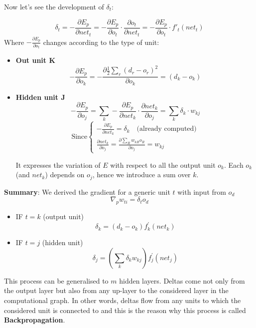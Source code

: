 \noindent Now let's see the development of $\delta_t$:

$$\delta_t = - \frac{\partial E_p}{\partial net_t} = - \frac{\partial E_p}{\partial o_t} \cdot \frac{\partial o_t}{\partial net_t} = - \frac{\partial E_p}{\partial o_t} \cdot f'_t(net_t)$$
Where $- \frac{\partial E_p}{\partial o_t}$ changes according to the type of unit:

\begin{itemize}
    \item \textbf{Out unit K}
    $$- \frac{\partial E_p}{\partial o_k} = - \frac{\partial \frac{1}{2} \sum_{r}(d_{r}-o_{r})^2}{\partial o_{k}} = (d_{k}-o_{k})$$ 
    
    \item \textbf{Hidden unit J}
    $$- \frac{\partial E_p}{\partial o_j} = \sum_{k} - \frac{\partial E_p}{\partial net_k}\cdot \frac{\partial net_k}{\partial o_j} = \sum_{k} \delta_k \cdot w_{kj}$$ 
    \[
    \text{Since}\left\{
        \begin{array}{ll}
            - \frac{\partial E_p}{\partial net_k} = \delta_k \quad \text{(already computed)}\\
            \frac{\partial net_k}{\partial o_j} = \frac{\partial \sum_{R}^{}w_{kR}o_R}{\partial o_j} = w_{kj}
        \end{array}
    \right. 
\]

It expresses the variation of $E$ with respect to all the output unit $o_k$. Each $o_k$ (and $net_k$) depends on $o_j$, hence we introduce a sum over $k$.
\end{itemize}

\noindent \textbf{Summary}: We derived the gradient for a generic unit $t$ with input from $o_d$
$$ \nabla_p w_{ti} = \delta_t o_d$$
\begin{itemize}
    \item IF $t = k$ (output unit)
        \begin{equation}
            \label{eq:g_output_unit}
            \delta_k = (d_k - o_k)f_k^{'}(net_k)
        \end{equation}
    \item IF $t = j$ (hidden unit)
        \begin{equation}
            \label{eq:g_hidden_unit}
            \delta_j = \left( \sum_{k}^{}\delta_k w_{kj} \right) f_j^{'}(net_j)
        \end{equation}

\end{itemize}

\noindent This process can be generalised to $m$ hidden layers. Deltas come not only from the output layer but also from any up-layer to the considered layer in the computational graph. In other words, deltas flow from any units to which the considered unit is connected to and this is the reason why this process is called \textbf{Backpropagation}.


